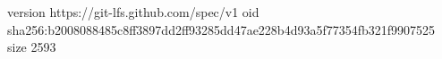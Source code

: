 version https://git-lfs.github.com/spec/v1
oid sha256:b2008088485c8ff3897dd2ff93285dd47ae228b4d93a5f77354fb321f9907525
size 2593
